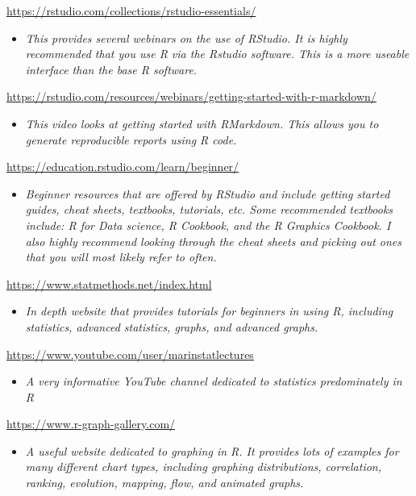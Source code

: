 \documentclass[
]{book}
\providecommand{\tightlist}{%
  \setlength{\itemsep}{0pt}\setlength{\parskip}{0pt}}
\begin{document}
\url{https://rstudio.com/collections/rstudio-essentials/}

\begin{itemize}
\tightlist
\item
  \emph{This provides several webinars on the use of RStudio. It is highly recommended that you use R via the Rstudio software. This is a more useable interface than the base R software.}
\end{itemize}

\url{https://rstudio.com/resources/webinars/getting-started-with-r-markdown/}

\begin{itemize}
\tightlist
\item
  \emph{This video looks at getting started with RMarkdown. This allows you to generate reproducible reports using R code.}
\end{itemize}

\url{https://education.rstudio.com/learn/beginner/}

\begin{itemize}
\tightlist
\item
  \emph{Beginner resources that are offered by RStudio and include getting started guides, cheat sheets, textbooks, tutorials, etc. Some recommended textbooks include: R for Data science, R Cookbook, and the R Graphics Cookbook. I also highly recommend looking through the cheat sheets and picking out ones that you will most likely refer to often.}
\end{itemize}

\url{https://www.statmethods.net/index.html}

\begin{itemize}
\tightlist
\item
  \emph{In depth website that provides tutorials for beginners in using R, including statistics, advanced statistics, graphs, and advanced graphs. }
\end{itemize}

\url{https://www.youtube.com/user/marinstatlectures}

\begin{itemize}
\tightlist
\item
  \emph{A very informative YouTube channel dedicated to statistics predominately in R }
\end{itemize}

\url{https://www.r-graph-gallery.com/}

\begin{itemize}
\tightlist
\item
  \emph{A useful website dedicated to graphing in R. It provides lots of examples for many different chart types, including graphing distributions, correlation, ranking, evolution, mapping, flow, and animated graphs.}
\end{itemize}
\end{document}
